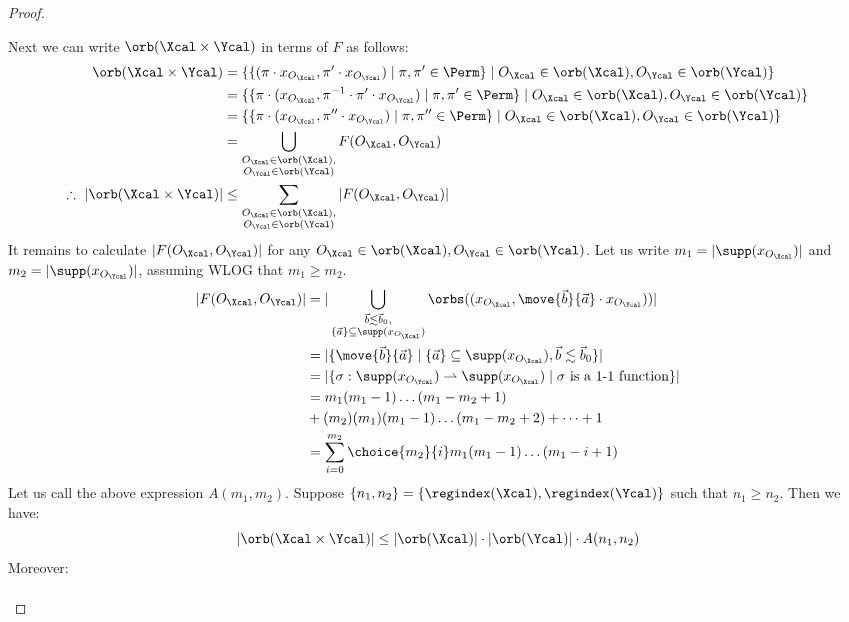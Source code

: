 \begin{proof}
\begin{enumerate}
	Next we can write $\orb(\Xcal \times \Ycal)$ in terms of $F$ as follows:
	\begin{align*}
		\orb(\Xcal\times \Ycal) &= \{\{(\pi \cdot x_{O_\Xcal},\pi'\cdot x_{O_\Ycal}) \mid \pi, \pi' \in \Perm\} \mid O_\Xcal \in \orb(\Xcal), O_\Ycal \in \orb(\Ycal)\}\\
		&= \{\{\pi\cdot (x_{O_\Xcal},\pi^{-1}\cdot \pi'\cdot x_{O_\Ycal}) \mid \pi, \pi' \in \Perm\} \mid O_\Xcal \in \orb(\Xcal), O_\Ycal \in \orb(\Ycal)\}\\
		&= \{\{\pi\cdot (x_{O_\Xcal},\pi''\cdot x_{O_\Ycal}) \mid \pi, \pi'' \in \Perm\} \mid O_\Xcal \in \orb(\Xcal), O_\Ycal \in \orb(\Ycal)\}\\
		&= \bigcup_{\substack{O_\Xcal \in \orb(\Xcal),\\ O_\Ycal \in \orb(\Ycal)}}F(O_\Xcal, O_\Ycal)\\
		\therefore\ |\orb(\Xcal \times \Ycal)| &\le \sum_{\substack{O_\Xcal \in \orb(\Xcal),\\ O_\Ycal \in \orb(\Ycal)}}|F(O_\Xcal, O_\Ycal)| 
	\end{align*}
	It remains to calculate $|F(O_\Xcal, O_\Ycal)|$ for any $O_\Xcal \in \orb(\Xcal), O_\Ycal \in \orb(\Ycal)$. 
	Let us write $m_1 = |\supp(x_{O_\Xcal})|$ and $m_2 = |\supp(x_{O_\Ycal})|$,  assuming WLOG that $m_1 \ge m_2$.
		\begin{align*}
		|F(O_\Xcal, O_\Ycal)| &= |\bigcup_{\substack{\vec b \lesssim \vec b_0,\\ \{\vec a\} \subseteq \supp(x_{O_\Xcal})}}\orbs((x_{O_\Xcal}, \move{\vec b}{\vec a}\cdot x_{O_\Ycal}))|\\
		&=
		|\{\move{\vec b}{\vec a} \mid \{\vec a\} \subseteq \supp(x_{O_\Xcal}), \vec b \lesssim \vec b_0\}|
		\\&= |\{\sigma: \supp(x_{O_\Ycal}) \rightharpoonup \supp(x_{O_\Xcal}) \mid \sigma\text{ is a 1-1 function}\}|
		\\ &= m_1(m_1 - 1)\dots(m_1 - m_2 + 1) 
		\\&+ (m_2)(m_1)(m_1 - 1)\dots(m_1 - m_2 + 2) + \dots + 1
		\\ &=\sum^{m_2}_{i = 0} \choice{m_2}{i} m_1(m_1 - 1)\dots(m_1 - i + 1)  
									\end{align*}
        Let us call the above expression $A(m_1,m_2)$.
        Suppose $\{n_1, n_2\} = \{\regindex(\Xcal), \regindex(\Ycal)\}$ such that $n_1 \ge n_2$.
        Then we have:
        \[
        |\orb(\Xcal \times \Ycal)| \le |\orb(\Xcal)|\cdot|\orb(\Ycal)|\cdot A(n_1,n_2)
      \]
      Moreover:
      \begin{align*}

\end{align*}
\end{enumerate}
\end{proof}
